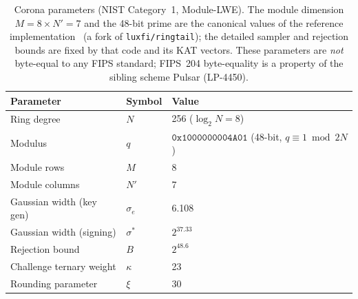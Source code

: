 \begin{table}[h]
\centering
\begin{tabular}{@{}lll@{}}
\toprule
\textbf{Parameter} & \textbf{Symbol} & \textbf{Value} \\
\midrule
Ring degree & $N$ & 256 \quad ($\log_2 N = 8$) \\
Modulus & $q$ & $\texttt{0x1000000004A01}$ \quad (48-bit, $q \equiv 1 \bmod 2N$) \\
Module rows & $M$ & 8 \\
Module columns & $N'$ & 7 \\
Gaussian width (key gen) & $\sigma_e$ & 6.108 \\
Gaussian width (signing) & $\sigma^*$ & $2^{37.33}$ \\
Rejection bound & $B$ & $2^{48.6}$ \\
Challenge ternary weight & $\kappa$ & 23 \\
Rounding parameter & $\xi$ & 30 \\
\bottomrule
\end{tabular}
\caption{Corona parameters (NIST Category~1, Module-LWE). The module dimension
$M = 8 \times N' = 7$ and the 48-bit prime are the canonical values of the reference
implementation~\cite{corona} (a fork of \texttt{luxfi/ringtail}); the detailed sampler
and rejection bounds are fixed by that code and its KAT vectors. These parameters are
\emph{not} byte-equal to any FIPS standard; FIPS~204 byte-equality is a property of the
sibling scheme Pulsar (LP-4450).}
\label{tab:params}
\end{table}

